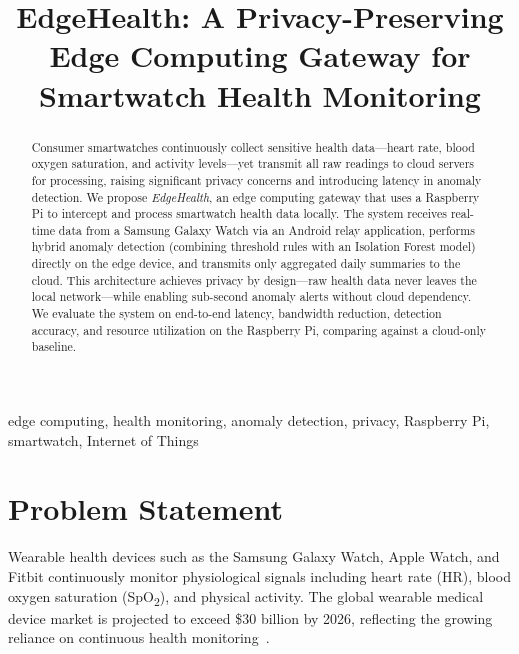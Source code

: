 \documentclass[conference]{IEEEtran}
\begin{document}
\title{EdgeHealth: A Privacy-Preserving Edge Computing Gateway for Smartwatch Health Monitoring}

\author{
}

\maketitle

\begin{abstract}
Consumer smartwatches continuously collect sensitive health data---heart rate, blood oxygen saturation, and activity levels---yet transmit all raw readings to cloud servers for processing, raising significant privacy concerns and introducing latency in anomaly detection. We propose \textit{EdgeHealth}, an edge computing gateway that uses a Raspberry Pi to intercept and process smartwatch health data locally. The system receives real-time data from a Samsung Galaxy Watch via an Android relay application, performs hybrid anomaly detection (combining threshold rules with an Isolation Forest model) directly on the edge device, and transmits only aggregated daily summaries to the cloud. This architecture achieves privacy by design---raw health data never leaves the local network---while enabling sub-second anomaly alerts without cloud dependency. We evaluate the system on end-to-end latency, bandwidth reduction, detection accuracy, and resource utilization on the Raspberry Pi, comparing against a cloud-only baseline.
\end{abstract}

\begin{IEEEkeywords}
edge computing, health monitoring, anomaly detection, privacy, Raspberry Pi, smartwatch, Internet of Things
\end{IEEEkeywords}

\section{Problem Statement}

Wearable health devices such as the Samsung Galaxy Watch, Apple Watch, and Fitbit continuously monitor physiological signals including heart rate (HR), blood oxygen saturation (SpO\textsubscript{2}), and physical activity. The global wearable medical device market is projected to exceed \$30 billion by 2026, reflecting the growing reliance on continuous health monitoring~\cite{wearable_market}.
\end{document}
